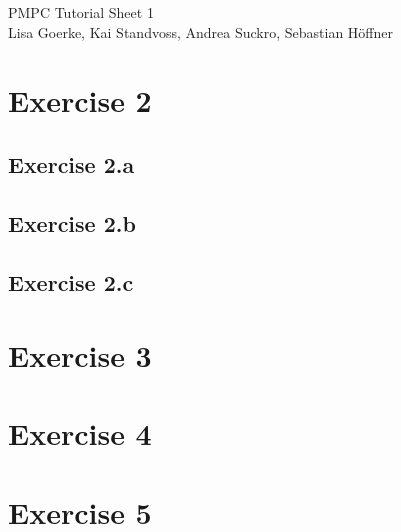 \documentclass{article}
\begin{document}
\Large PMPC Tutorial Sheet 1\\
\small Lisa Goerke, Kai Standvoss, Andrea Suckro, Sebastian H\"offner
\vspace{0.5cm}
\normalsize


\section*{Exercise 2}
\subsection*{Exercise 2.a}




\subsection*{Exercise 2.b}


\subsection*{Exercise 2.c}



\section*{Exercise 3}


\section*{Exercise 4}


\section*{Exercise 5}
\end{document}
